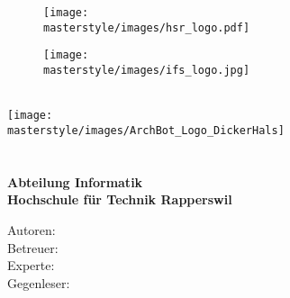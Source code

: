 \begin{titlepage}
\begin{flushleft}

\begin{figure}[tbp]
  \begin{minipage}[c]{0.4\textwidth}
    \texttt{[image: \\masterstyle/images/hsr\_logo.pdf]}
  \end{minipage}
  \hfill
  \begin{minipage}[c]{0.3\textwidth}
    \texttt{[image: \\masterstyle/images/ifs\_logo.jpg]}
  \end{minipage}
\end{figure}

\noindent\begin{minipage}[t]{0.49\textwidth}
  \begin{flushleft}
    \vspace{0pt}
  \end{flushleft}
\end{minipage}
\hfill
\begin{minipage}[t]{0.49\textwidth}
  \begin{flushright}
    \vspace{0pt}
  \end{flushright}
\end{minipage}
\\[4cm]

\texttt{[image: \\masterstyle/images/ArchBot\_Logo\_DickerHals]}\\[2cm]
{\Huge \bfseries \TITLE}\\[1cm]
{\huge \bfseries \SUBTITLE}\\[0.5cm]
{\large \bfseries Abteilung Informatik}\\
{\large \bfseries Hochschule für Technik Rapperswil}\\

\vfill

Autoren: \AUTHOR \\
Betreuer: \SUPERVISOR \\
Experte: \EXPERTE \\
Gegenleser: \GEGENLESER \\

\end{flushleft}
\end{titlepage}

